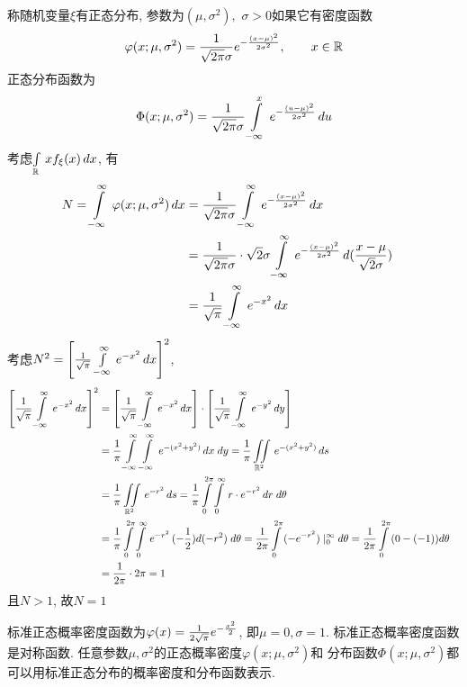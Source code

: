 \begin{gauss_distru}[正态分布]
称随机变量\(\xi\)有正态分布, 参数为\((\mu, \sigma^2),\,\,\sigma>0\)如果它有密度函数
\begin{align}
\varphi(x; \mu, \sigma^2) = {1\over\sqrt{2\pi}\sigma}e^{-{(x-\mu)^2\over 2\sigma^2}},\qquad x\in\Rs
\end{align}
正态分布函数为
\begin{align}
\Phi(x; \mu, \sigma^2) = {1\over\sqrt{2\pi}\sigma}\int\limits_{-\infty}^{x}\,e^{-{(u-\mu)^2\over 2\sigma^2}}\,du
\end{align}
考虑\(\int\limits_{\Rs}\,xf_\xi(x)\,dx\), 有
\begin{align}
N = \int\limits_{-\infty}^{\infty}\,\varphi(x; \mu, \sigma^2)\,dx &= 
   {1\over\sqrt{2\pi}\sigma}\int\limits_{-\infty}^{\infty}\,e^{-{(x-\mu)^2\over 2\sigma^2}}\,dx\cr
&= {1\over\sqrt{2\pi}\sigma}\cdot{\sqrt{2}\sigma}\int\limits_{-\infty}^{\infty}\,e^{-{(x-\mu)^2\over 2\sigma^2}}\,d({x-\mu\over\sqrt{2}\sigma})\cr
&= {1\over\sqrt{\pi}}\int\limits_{-\infty}^{\infty}\,e^{-x^2}\,dx
\end{align}
考虑\(N^2 = \left[{1\over\sqrt{\pi}}\int\limits_{-\infty}^{\infty}\,e^{-x^2}\,dx\right]^2\),
\begin{align}
\left[{1\over\sqrt{\pi}}\int\limits_{-\infty}^{\infty}\,e^{-x^2}\,dx\right]^2 &= 
\left[{1\over\sqrt{\pi}}\int\limits_{-\infty}^{\infty}\,e^{-x^2}\,dx\right]\cdot
\left[{1\over\sqrt{\pi}}\int\limits_{-\infty}^{\infty}\,e^{-y^2}\,dy\right]\cr
&= {1\over\pi}\int\limits_{-\infty}^{\infty}\int\limits_{-\infty}^{\infty}\,e^{-(x^2 + y^2)}\,dx\;dy = 
   {1\over\pi}\iint\limits_{\Rs^2}\,e^{-(x^2 + y^2)}\,ds\cr
&= {1\over\pi}\iint\limits_{\Rs^2}\,e^{-r^2}\,ds = 
   {1\over\pi}\int\limits_{0}^{2\pi}\int\limits_{0}^{\infty}\,r\cdot e^{-r^2}\,dr\;d\theta\cr
&= {1\over\pi}\int\limits_{0}^{2\pi}\int\limits_{0}^{\infty}\, e^{-r^2}\,(-{1\over 2})d(-r^2)\;d\theta =
    {1\over 2\pi}\int\limits_{0}^{2\pi}\,(-e^{-r^2})\mid_{0}^{\infty}d\theta =
    {1\over 2\pi}\int\limits_{0}^{2\pi}\,(0 - (-1))d\theta\cr
&= {1\over 2\pi}\cdot 2\pi = 1
\end{align}
且\(N > 1\), 故\(N = 1\)
\end{gauss_distru}

标准正态概率密度函数为\(\varphi(x) = {1\over 2\sqrt{\pi}}e^{-{x^2\over 2}}\), 即\(\mu = 0, \sigma = 1\).
标准正态概率密度函数是对称函数. 任意参数\(\mu, \sigma^2\)的正态概率密度\(\varphi(x; \mu, \sigma^2)\)和
分布函数\(\Phi(x; \mu, \sigma^2)\)都可以用标准正态分布的概率密度和分布函数表示.

